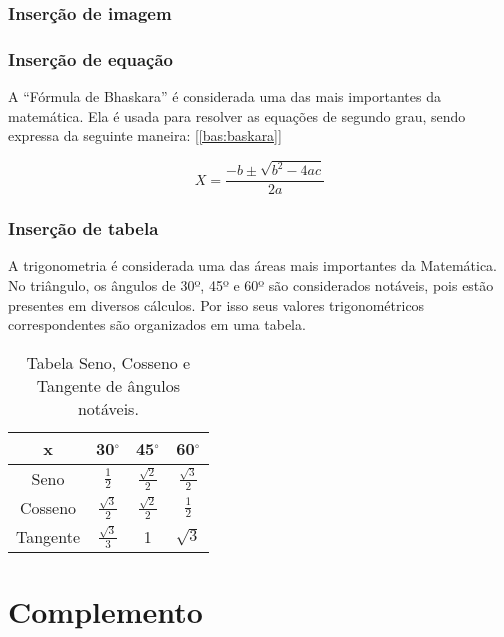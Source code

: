 \documentclass{article}
\begin{document}
\subsubsection{Inserção de imagem}



\subsubsection{Inserção de equação}

A “Fórmula de Bhaskara” é considerada uma das mais importantes da matemática. Ela é usada para resolver as equações de segundo grau, sendo expressa da seguinte maneira: [\ref{bas:baskara}]

\begin{equation}
	 X = \frac{-b \pm \sqrt{b^2 - 4ac}}{2a}  
	\label{bas:baskara}
\end{equation}

\subsubsection{Inserção de tabela}
A trigonometria é considerada uma das áreas mais importantes da Matemática. No triângulo, os ângulos de 30º, 45º e 60º são considerados notáveis, pois estão presentes em diversos cálculos. Por isso seus valores trigonométricos correspondentes são organizados em uma tabela. 

\begin{table}[htb]
	\centering
	\begin{tabular}{ |c|c|c|c| } 
 		\hline
 		 x &  30$^\circ$ & 45$^\circ$ & 60$^\circ$                                    \\ \hline 
 		Seno & $\frac{1}{2}$ & $\frac{\sqrt{2}}{2}$ &  $\frac{\sqrt{3}}{2}$             \\ \hline
 		Cosseno & $\frac{\sqrt{3}}{2}$ & $\frac{\sqrt{2}}{2}$ & $\frac{1}{2}$              \\ \hline
 		Tangente & $\frac{\sqrt{3}}{3}$ & 1 & $\sqrt{3}$                                     \\ 
 		\hline
	\end{tabular}
	\caption{Tabela Seno, Cosseno e Tangente de ângulos notáveis.}
	\label{tab:Tabela}
\end{table}

\clearpage



\section{Complemento}
\end{document}

